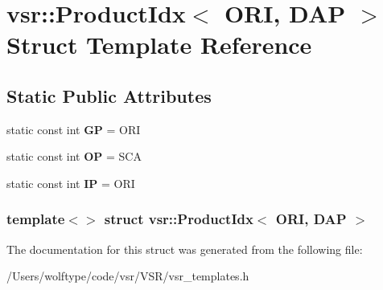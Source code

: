 \hypertarget{structvsr_1_1_product_idx_3_01_o_r_i_00_01_d_a_p_01_4}{\section{vsr\-:\-:Product\-Idx$<$ O\-R\-I, D\-A\-P $>$ Struct Template Reference}
\label{structvsr_1_1_product_idx_3_01_o_r_i_00_01_d_a_p_01_4}
}
\subsection*{Static Public Attributes}
\begin{DoxyCompactItemize}
\item 
\hypertarget{structvsr_1_1_product_idx_3_01_o_r_i_00_01_d_a_p_01_4_ab4d5bec0aefcf4139096a390ae083b7b}{static const int {\bfseries G\-P} = O\-R\-I}\label{structvsr_1_1_product_idx_3_01_o_r_i_00_01_d_a_p_01_4_ab4d5bec0aefcf4139096a390ae083b7b}

\item 
\hypertarget{structvsr_1_1_product_idx_3_01_o_r_i_00_01_d_a_p_01_4_a8f99f7a965eb6cca35f53ea244fceed3}{static const int {\bfseries O\-P} = S\-C\-A}\label{structvsr_1_1_product_idx_3_01_o_r_i_00_01_d_a_p_01_4_a8f99f7a965eb6cca35f53ea244fceed3}

\item 
\hypertarget{structvsr_1_1_product_idx_3_01_o_r_i_00_01_d_a_p_01_4_a1403568ec06728b8af29a5be2f02e0f3}{static const int {\bfseries I\-P} = O\-R\-I}\label{structvsr_1_1_product_idx_3_01_o_r_i_00_01_d_a_p_01_4_a1403568ec06728b8af29a5be2f02e0f3}

\end{DoxyCompactItemize}
\subsubsection*{template$<$$>$ struct vsr\-::\-Product\-Idx$<$ O\-R\-I, D\-A\-P $>$}



The documentation for this struct was generated from the following file\-:\begin{DoxyCompactItemize}
\item 
/\-Users/wolftype/code/vsr/\-V\-S\-R/vsr\-\_\-templates.\-h\end{DoxyCompactItemize}
